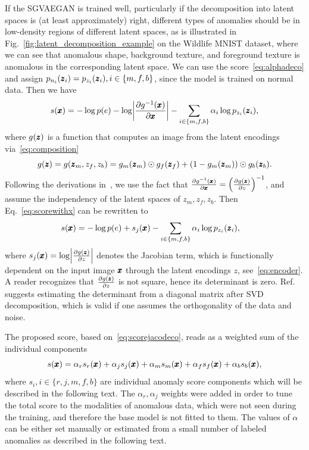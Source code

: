 If the SGVAEGAN is trained well, particularly if the decomposition into latent spaces is (at least approximately) right, different types of anomalies should be in low-density regions of different latent spaces, as is illustrated in Fig.~\ref{fig:latent_decomposition_example} on the Wildlife MNIST dataset, where we can see that anomalous shape, background texture, and foreground texture is anomalous in the corresponding latent space. We can use the score~\eqref{eq:alphadeco} and assign $p_{n_i}(\pmb{{z}}_i) = p_{z_i}(\pmb{{z}}_i), i \in \lbrace m,f,b \rbrace$, since the model is trained on normal data. Then we have
\begin{equation}
s(\vc{x}) = - \log p(e)  - \log\left\vert \frac{\partial g^{-1}(\vc{x})}{\partial \vc{x}}\right\vert -  \sum_{i\in\{m,f,b\}}\alpha_{i}\log p_{z_{i}}(\vc{z}_{i}),	
\label{eq:scorewithx}
\end{equation}
where $g(\pmb{{z}})$ is a function that computes an image from the latent encodings via~\eqref{eq:composition}
\begin{equation}
g(\pmb{{z}}) = g(\pmb{{z}}_m, z_f, z_b) = g_m(\pmb{{z}}_m) \odot g_f(\pmb{{z}}_f) + (1 - g_m(\pmb{{z}}_m)) \odot g_b(\pmb{{z}}_b).
\end{equation}
Following the derivations in~\cite{vsmidl2019anomaly}, we use the fact that $\frac{\partial g^{-1}(\vc{x})}{\partial \vc{x}} = \left( \frac{\partial g(\vc{z})}{\partial z} \right) ^{-1}$, and assume the independency of the latent spaces of $z_m, z_f, z_b$. Then Eq.~\eqref{eq:scorewithx} can be rewritten to 
\begin{align} \label{eq:scorejacodeco}	
s(\pmb{{x}}) & = - \log p(e)  + s_j(\pmb{{x}}) -  \sum_{i\in\{m,f,b\}} \alpha_{i}\log p_{z_{i}}(\pmb{{z}}_{i}),
\end{align}
where $s_j(\vc{x}) = \log \left\vert  \frac{\partial g(\vc{z})}{\partial z}  \right\vert $ denotes the Jacobian term, which is functionally dependent on the input image $\pmb{{x}}$ through the latent encodings $z$, see~\eqref{eq:encoder}. A reader recognizes that $\frac{\partial g(\pmb{{z}})}{\partial z}$ is not square, hence its determinant is zero. Ref.~\cite{vsmidl2019anomaly} suggests estimating the determinant from a diagonal matrix after SVD decomposition, which is valid if one assumes the orthogonality of the data and noise.

The proposed score, based on~\eqref{eq:scorejacodeco}, reads as a weighted sum of the individual components
\begin{equation} \label{eq:totalscorejacobian}
    s(\pmb{{x}}) = \alpha_{r}  s_{r}(\pmb{{x}}) + \alpha_j s_j(\pmb{{x}}) + \alpha_m s_{m}(\pmb{{x}}) + \alpha_f s_{f}(\pmb{{x}}) + \alpha_b s_{b}(\pmb{{x}}),
\end{equation}
where $s_i, i \in \{r, j, m, f, b\}$ are individual anomaly score components which will be described in the following text. The $\alpha_r, \alpha_j$ weights were added in order to tune the total score to the modalities of anomalous data, which were not seen during the training, and therefore the base model is not fitted to them. The values of $\alpha$ can be either set manually or estimated from a small number of labeled anomalies as described in the following text.

